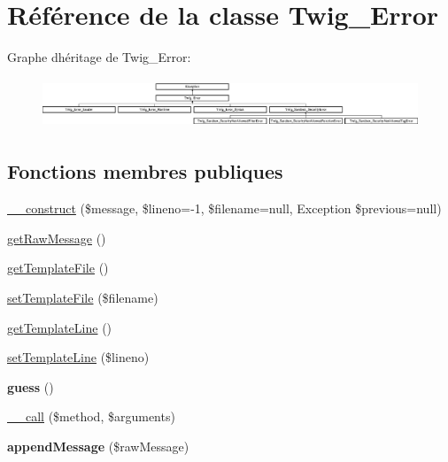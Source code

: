 \hypertarget{class_twig___error}{}\section{Référence de la classe Twig\+\_\+\+Error}
\label{class_twig___error}
Graphe d\textquotesingle{}héritage de Twig\+\_\+\+Error\+:\begin{figure}[H]
\begin{center}
\leavevmode
\includegraphics[height=1.498328cm]{class_twig___error}
\end{center}
\end{figure}
\subsection*{Fonctions membres publiques}
\begin{DoxyCompactItemize}
\item 
\hyperlink{class_twig___error_a61443b1ca6c32f74ff85c2fd550110cf}{\+\_\+\+\_\+construct} (\$message, \$lineno=-\/1, \$filename=null, Exception \$previous=null)
\item 
\hyperlink{class_twig___error_ae10360028f8c467cf5855bcaf76b091f}{get\+Raw\+Message} ()
\item 
\hyperlink{class_twig___error_a7d4dd918a3bd7ea19213e1745e7b4944}{get\+Template\+File} ()
\item 
\hyperlink{class_twig___error_aecc0e5e79dece93715f37d05a9bec2ae}{set\+Template\+File} (\$filename)
\item 
\hyperlink{class_twig___error_abe0a6ba69feb4cba19f4a408462a976e}{get\+Template\+Line} ()
\item 
\hyperlink{class_twig___error_a8c9d5c088f27156f8fffa52222efbe29}{set\+Template\+Line} (\$lineno)
\item 
{\bfseries guess} ()\hypertarget{class_twig___error_a16664471dad3413d0fb0370b4068d634}{}\label{class_twig___error_a16664471dad3413d0fb0370b4068d634}

\item 
\hyperlink{class_twig___error_acfa40ec504c3c792c3b84cf2f1af511d}{\+\_\+\+\_\+call} (\$method, \$arguments)
\item 
{\bfseries append\+Message} (\$raw\+Message)\hypertarget{class_twig___error_aea80188b878e626c939e71fa4213d0ac}{}\label{class_twig___error_aea80188b878e626c939e71fa4213d0ac}

\end{DoxyCompactItemize}
